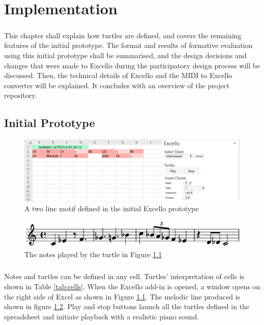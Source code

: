 
\chapter{Implementation}

\paragraph{} This chapter shall explain how turtles are defined, and covers the remaining features of the initial prototype. The format and results of formative evaluation using this initial prototype shall be summarised, and the design decisions and changes that were made to Excello during the participatory design process will be discussed. Then, the technical details of Excello and the MIDI to Excello converter will be explained. It concludes with an overview of the project repository.

\section{Initial Prototype}

\begin{figure}[tbh]
\centerline{\includegraphics[width=150mm]{figs/initialPrototype.png}}
\caption{A two line motif defined in the initial Excello prototype}
\label{implementation:initialPrototype}
\end{figure}
\begin{figure}[tbh]
\centerline{\includegraphics[width=150mm]{figs/initialScore.png}}
\caption{The notes played by the turtle in Figure \ref{implementation:initialPrototype}}
\label{implementation:initialScore}
\end{figure}

\vspace{-10pt}
\paragraph{} Notes and turtles can be defined in any cell. Turtles' interpretation of cells is shown in Table \ref{tab:cells}. When the Excello add-in is opened, a window opens on the right side of Excel as shown in Figure \ref{implementation:initialPrototype}. The melodic line produced is shown in figure \ref{implementation:initialScore}. Play and stop buttons launch all the turtles defined in the spreadsheet and initiate playback with a realistic piano sound.

